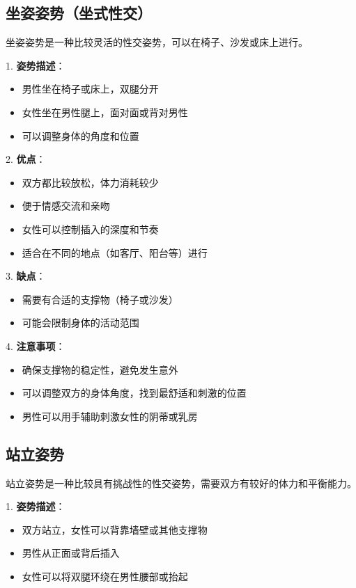 \documentclass[12pt,UTF8]{ctexbook}
\begin{document}
\subsection{坐姿姿势（坐式性交）}

坐姿姿势是一种比较灵活的性交姿势，可以在椅子、沙发或床上进行。

1. \textbf{姿势描述}：
  \begin{itemize}
  \item 男性坐在椅子或床上，双腿分开
  \item 女性坐在男性腿上，面对面或背对男性
  \item 可以调整身体的角度和位置
  \end{itemize}

2. \textbf{优点}：
  \begin{itemize}
  \item 双方都比较放松，体力消耗较少
  \item 便于情感交流和亲吻
  \item 女性可以控制插入的深度和节奏
  \item 适合在不同的地点（如客厅、阳台等）进行
  \end{itemize}

3. \textbf{缺点}：
  \begin{itemize}
  \item 需要有合适的支撑物（椅子或沙发）
  \item 可能会限制身体的活动范围
  \end{itemize}

4. \textbf{注意事项}：
  \begin{itemize}
  \item 确保支撑物的稳定性，避免发生意外
  \item 可以调整双方的身体角度，找到最舒适和刺激的位置
  \item 男性可以用手辅助刺激女性的阴蒂或乳房
  \end{itemize}

\subsection{站立姿势}

站立姿势是一种比较具有挑战性的性交姿势，需要双方有较好的体力和平衡能力。

1. \textbf{姿势描述}：
  \begin{itemize}
  \item 双方站立，女性可以背靠墙壁或其他支撑物
  \item 男性从正面或背后插入
  \item 女性可以将双腿环绕在男性腰部或抬起
  \end{itemize}
\end{document}
